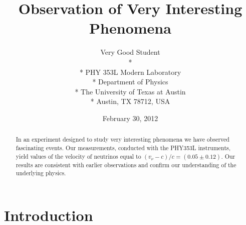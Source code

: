 \documentclass[11pt,letterpaper,onecolumn]{article}
\begin{document}

\title{\bf Observation of Very Interesting Phenomena}

\author{
 Very Good Student \\*
  \\*
 PHY 353L Modern Laboratory \\*
 Department of Physics \\*
 The University of Texas at Austin \\*
 Austin, TX 78712, USA
}
\date{February 30, 2012}


\maketitle


\begin{abstract}

In an experiment designed to study very interesting phenomena
we have observed fascinating events. Our measurements, conducted
with the PHY353L instruments, yield values of the velocity of neutrinos 
equal to $(v_\nu - c)/c  = (0.05\pm0.12)$. Our results are consistent with earlier 
observations and confirm our understanding of the underlying physics.

\end{abstract}



\section{Introduction} 
\end{document}
